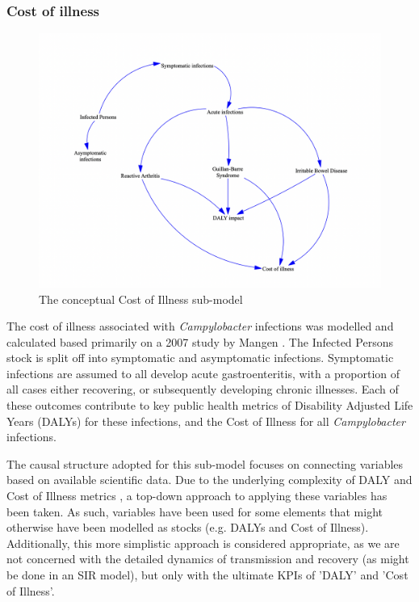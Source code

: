 \subsubsection*{Cost of illness}
\begin{figure}[h]
\centering
\includegraphics[width=\textwidth]{images/COI_submodel.png}
\caption{The conceptual Cost of Illness sub-model}
\end{figure}
The cost of illness associated with \textit{Campylobacter} infections was modelled and calculated based primarily on a 2007 study by Mangen \parencite{mangen_campylobacteriosis_2007}. The Infected Persons stock is split off into symptomatic and asymptomatic infections. Symptomatic infections are assumed to all develop acute gastroenteritis, with a proportion of all cases either recovering, or subsequently developing chronic illnesses. Each of these outcomes contribute to key public health metrics of Disability Adjusted Life Years (DALYs) for these infections, and the Cost of Illness for all \textit{Campylobacter} infections. 

The causal structure adopted for this sub-model focuses on connecting variables based on available scientific data. Due to the underlying complexity of DALY and Cost of Illness metrics \parencite{jo_cost--illness_2014}, a top-down approach to applying these variables has been taken. As such, variables have been used for some elements that might otherwise have been modelled as stocks (e.g. DALYs and Cost of Illness). Additionally, this more simplistic approach is considered appropriate, as we are not concerned with the detailed dynamics of transmission and recovery (as might be done in an SIR model), but only with the ultimate KPIs of 'DALY' and 'Cost of Illness'.

